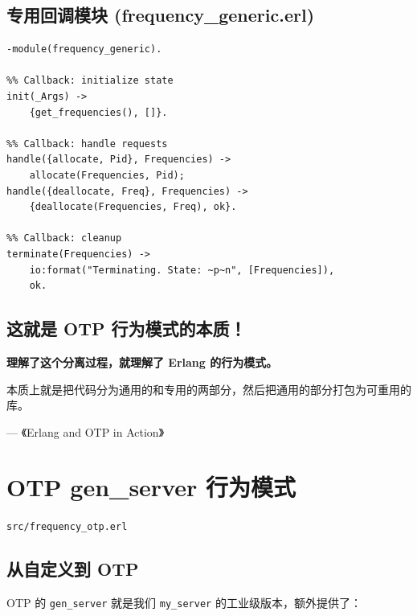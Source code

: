 \documentclass[a4paper,11pt]{article}
\begin{document}
\subsection{专用回调模块 (frequency\_generic.erl)}

\begin{lstlisting}[style=erlangstyle, caption={frequency\_generic.erl --- 回调模块}]
-module(frequency_generic).

%% Callback: initialize state
init(_Args) ->
    {get_frequencies(), []}.

%% Callback: handle requests
handle({allocate, Pid}, Frequencies) ->
    allocate(Frequencies, Pid);
handle({deallocate, Freq}, Frequencies) ->
    {deallocate(Frequencies, Freq), ok}.

%% Callback: cleanup
terminate(Frequencies) ->
    io:format("Terminating. State: ~p~n", [Frequencies]),
    ok.
\end{lstlisting}

\subsection{这就是 OTP 行为模式的本质！}

\begin{tipbox}[核心理解]
\textbf{理解了这个分离过程，就理解了 Erlang 的行为模式。}

本质上就是把代码分为通用的和专用的两部分，然后把通用的部分打包为可重用的库。

\hfill --- 《Erlang and OTP in Action》
\end{tipbox}


\section{OTP gen\_server 行为模式}

\begin{notebox}[源码文件]
\texttt{src/frequency\_otp.erl}
\end{notebox}

\subsection{从自定义到 OTP}

OTP 的 \texttt{gen\_server} 就是我们 \texttt{my\_server} 的工业级版本，额外提供了：
\end{document}
